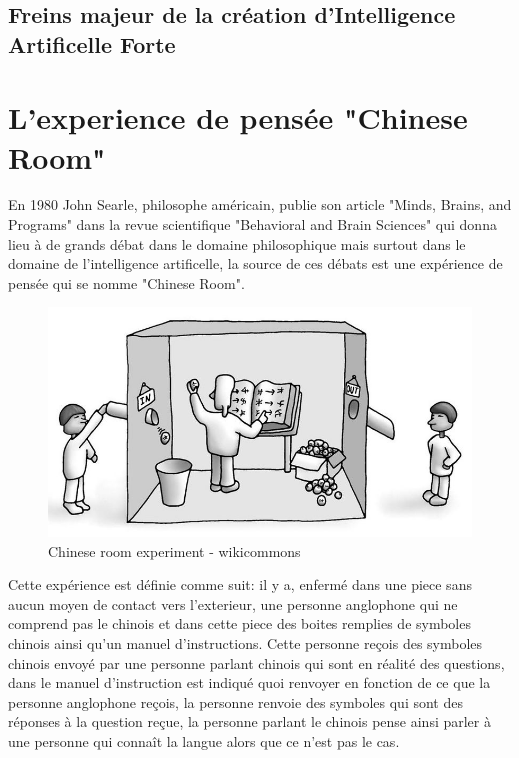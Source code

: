 \newpage
\subsection{Freins majeur de la création d'Intelligence Artificelle Forte}
\section{L'experience de pensée "Chinese Room"}
En 1980 John Searle, philosophe américain, publie son article "Minds, Brains, and Programs" dans la revue 
scientifique "Behavioral and Brain Sciences" qui donna lieu à de grands débat dans le domaine philosophique 
mais surtout dans le domaine de l'intelligence artificelle, 
la source de ces débats est une expérience de pensée qui se nomme "Chinese Room". \newline

\begin{figure}[H]
    \centering
    \includegraphics[width=1\textwidth]{Images/chineseroom}
    \caption{Chinese room experiment - wikicommons}
	\label{fig:chineseroom}
\end{figure}

Cette expérience est définie comme suit: \newline
il y a, enfermé dans une piece sans aucun moyen de contact vers l'exterieur, une personne anglophone qui ne comprend 
pas le chinois et dans cette piece des boites remplies de symboles chinois ainsi qu'un manuel d'instructions.
Cette personne reçois des symboles chinois envoyé par une personne parlant chinois qui sont en réalité des questions,
dans le manuel d'instruction est indiqué quoi renvoyer en fonction de ce que la personne anglophone reçois,
la personne renvoie des symboles qui sont des réponses à la question reçue, la personne parlant le chinois
pense ainsi parler à une personne qui connaît la langue alors que ce n'est pas le cas. 
\newpage

